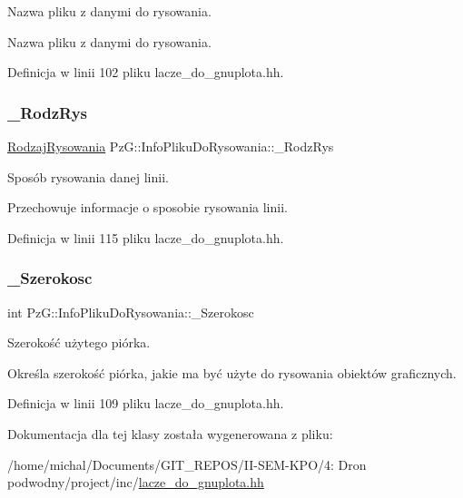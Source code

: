 Nazwa pliku z danymi do rysowania. 

Nazwa pliku z danymi do rysowania. 

Definicja w linii 102 pliku lacze\+\_\+do\+\_\+gnuplota.\+hh.

\mbox{\label{class_pz_g_1_1_info_pliku_do_rysowania_ac2512f2073c66164beb2e88db31344a4}} 
\subsubsection{\texorpdfstring{\+\_\+\+Rodz\+Rys}{\_RodzRys}}
{\footnotesize\ttfamily \hyperlink{namespace_pz_g_a705c92106f39b7d0c34a6739d10ff0b6}{Rodzaj\+Rysowania} Pz\+G\+::\+Info\+Pliku\+Do\+Rysowania\+::\+\_\+\+Rodz\+Rys\hspace{0.3cm}{\ttfamily [private]}}



Sposób rysowania danej linii. 

Przechowuje informacje o sposobie rysowania linii. 

Definicja w linii 115 pliku lacze\+\_\+do\+\_\+gnuplota.\+hh.

\mbox{\label{class_pz_g_1_1_info_pliku_do_rysowania_a56a03dde7a7a414dbf3c230812a8d741}} 
\subsubsection{\texorpdfstring{\+\_\+\+Szerokosc}{\_Szerokosc}}
{\footnotesize\ttfamily int Pz\+G\+::\+Info\+Pliku\+Do\+Rysowania\+::\+\_\+\+Szerokosc\hspace{0.3cm}{\ttfamily [private]}}



Szerokość użytego piórka. 

Określa szerokość piórka, jakie ma być użyte do rysowania obiektów graficznych. 

Definicja w linii 109 pliku lacze\+\_\+do\+\_\+gnuplota.\+hh.



Dokumentacja dla tej klasy została wygenerowana z pliku\+:\begin{DoxyCompactItemize}
\item 
/home/michal/\+Documents/\+G\+I\+T\+\_\+\+R\+E\+P\+O\+S/\+I\+I-\/\+S\+E\+M-\/\+K\+P\+O/4\+: Dron podwodny/project/inc/\hyperlink{lacze__do__gnuplota_8hh}{lacze\+\_\+do\+\_\+gnuplota.\+hh}\end{DoxyCompactItemize}
